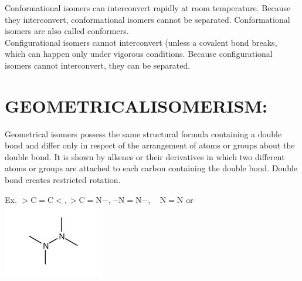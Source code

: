\documentclass[10pt]{article}
\begin{document}
Conformational isomers can interconvert rapidly at room temperature. Because they interconvert, conformational isomers cannot be separated. Conformational isomers are also called conformers.\\
Configurational isomers cannot interconvert (unless a covalent bond breaks, which can happen only under vigorous conditions. Because configurational isomers cannot interconvert, they can be separated.

\section*{GEOMETRICALISOMERISM:}
Geometrical isomers possess the same structural formula containing a double bond and differ only in respect of the arrangement of atoms or groups about the double bond. It is shown by alkenes or their derivatives in which two different atoms or groups are attached to each carbon containing the double bond. Double bond creates restricted rotation.

Ex. $>\mathrm{C}=\mathrm{C}<,>\mathrm{C}=\mathrm{N}-,-\mathrm{N}=\mathrm{N}-, \quad \mathrm{N}=\mathrm{N}$ or\\
\includegraphics{smile-2e2776ef358191343ff4a10d7588825a19cdbf29}
\end{document}
